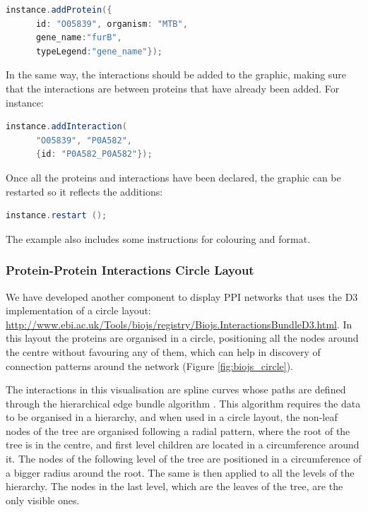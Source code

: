 \begin{lstlisting}[language=java]
instance.addProtein({
      id: "O05839", organism: "MTB",
      gene_name:"furB",
      typeLegend:"gene_name"});
\end{lstlisting}
					
In the same way, the interactions should be added to the graphic, making sure that the interactions are between proteins that have already been added. For instance:

\begin{lstlisting}[language=java]
instance.addInteraction(
      "O05839", "P0A582",
      {id: "P0A582_P0A582"}); 
\end{lstlisting}
					
Once all the proteins and interactions have been declared, the graphic can be restarted so it reflects the additions:

\begin{lstlisting}[language=java]
instance.restart ();
\end{lstlisting}

The example also includes some instructions for colouring and format. 


\subsubsection{Protein-Protein Interactions Circle Layout} \label{subsubsec:ppi2_biojs}
We have developed another component to display PPI networks that uses the D3 implementation of a circle layout: \url{http://www.ebi.ac.uk/Tools/biojs/registry/Biojs.InteractionsBundleD3.html}. In this layout the proteins are organised in a circle, positioning all the nodes around the centre without favouring any of them, which can help in discovery of connection patterns around the network (Figure \ref{fig:biojs_circle}). 

The interactions in this visualisation are spline curves whose paths are defined through the hierarchical edge bundle algorithm \cite{HOL2006}. This algorithm requires the data to be organised in a hierarchy, and when used in a circle layout, the non-leaf nodes of the tree are organised following a radial pattern, where the root of the tree is in the centre, and first level children are located in a circumference around it. The nodes of the following level of the tree are positioned in a circumference of a bigger radius around the root. The same is then applied to all the levels of the hierarchy. The nodes in the last level, which are the leaves of the tree, are the only visible ones.

